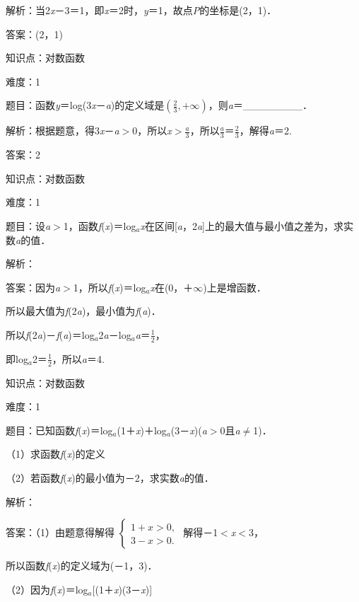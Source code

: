 \documentclass{article} %
\begin{document}
解析：当2\textit{x}－3＝1，即\textit{x}＝2时，\textit{y}＝1，故点\textit{P}的坐标是(2，1)．

答案：(2，1)

知识点：对数函数

难度：1

题目：函数\textit{y}＝log(3\textit{x}－\textit{a})的定义域是$(\frac{2}{3},+\infty)$，则\textit{a}＝\_\_\_\_\_\_\_\_．

解析：根据题意，得3\textit{x}－\textit{a}$\mathrm{>}$0，所以\textit{x}$\mathrm{>}$$\frac{a}{3}$，所以$\frac{a}{3}$＝$\frac{2}{3}$，解得\textit{a}＝2.

答案：2

知识点：对数函数

难度：1

题目：设\textit{a}$\mathrm{>}$1，函数\textit{f}(\textit{x})＝log\textit{${}_{a}$x}在区间[\textit{a}，2\textit{a}]上的最大值与最小值之差为，求实数\textit{a}的值．

解析：

答案：因为\textit{a}$\mathrm{>}$1，所以\textit{f}(\textit{x})＝log\textit{${}_{a}$x}在(0，＋$\mathrm{\infty}$)上是增函数．

所以最大值为\textit{f}(2\textit{a})，最小值为\textit{f}(\textit{a})．

所以\textit{f}(2\textit{a})－\textit{f}(\textit{a})＝log\textit{${}_{a}$}2\textit{a}－log\textit{${}_{a}$a}＝$\frac{1}{2}$，

即log\textit{${}_{a}$}2＝$\frac{1}{2}$，所以\textit{a}＝4.

知识点：对数函数

难度：1

题目：已知函数\textit{f}(\textit{x})＝log\textit{${}_{a}$}(1＋\textit{x})＋log\textit{${}_{a}$}(3－\textit{x})(\textit{a}$\mathrm{>}$0且\textit{a}$\mathrm{\neq}$1)．

（1）求函数\textit{f}(\textit{x})的定义

（2）若函数\textit{f}(\textit{x})的最小值为－2，求实数\textit{a}的值．

解析：

答案：（1）由题意得解得
$\left\{
\begin{array}{l}
1+x>0,\\
3-x>0.
\end{array}
\right.
$
解得－1$\mathrm{<}$\textit{x}$\mathrm{<}$3，

所以函数\textit{f}(\textit{x})的定义域为(－1，3)．

（2）因为\textit{f}(\textit{x})＝log\textit{${}_{a}$}[(1＋\textit{x})(3－\textit{x})]
\end{document}
